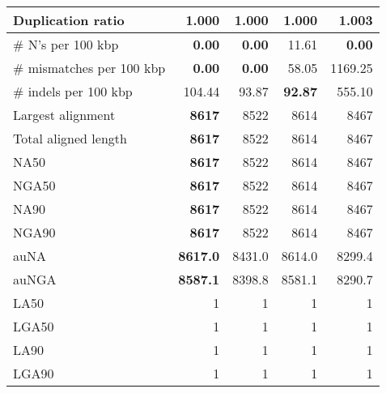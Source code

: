 \documentclass[12pt,a4paper]{article}
\begin{document}
\begin{table}[ht]
\begin{center}
\begin{tabular}{|l*{4}{|r}|}
Duplication ratio & {\bf 1.000} & {\bf 1.000} & {\bf 1.000} & 1.003 \\ \hline
\# N's per 100 kbp & {\bf 0.00} & {\bf 0.00} & 11.61 & {\bf 0.00} \\ \hline
\# mismatches per 100 kbp & {\bf 0.00} & {\bf 0.00} & 58.05 & 1169.25 \\ \hline
\# indels per 100 kbp & 104.44 & 93.87 & {\bf 92.87} & 555.10 \\ \hline
Largest alignment & {\bf 8617} & 8522 & 8614 & 8467 \\ \hline
Total aligned length & {\bf 8617} & 8522 & 8614 & 8467 \\ \hline
NA50 & {\bf 8617} & 8522 & 8614 & 8467 \\ \hline
NGA50 & {\bf 8617} & 8522 & 8614 & 8467 \\ \hline
NA90 & {\bf 8617} & 8522 & 8614 & 8467 \\ \hline
NGA90 & {\bf 8617} & 8522 & 8614 & 8467 \\ \hline
auNA & {\bf 8617.0} & 8431.0 & 8614.0 & 8299.4 \\ \hline
auNGA & {\bf 8587.1} & 8398.8 & 8581.1 & 8290.7 \\ \hline
LA50 & 1 & 1 & 1 & 1 \\ \hline
LGA50 & 1 & 1 & 1 & 1 \\ \hline
LA90 & 1 & 1 & 1 & 1 \\ \hline
LGA90 & 1 & 1 & 1 & 1 \\ \hline
\end{tabular}
\end{center}
\end{table}
\end{document}
